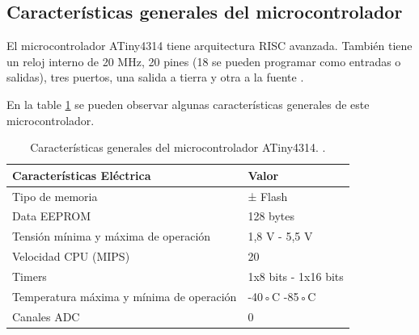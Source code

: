 \documentclass[12pt,letterpaper]{article}     %
\begin{document}
\subsection{Caracter\'isticas generales del microcontrolador} 
El microcontrolador ATiny4314 tiene arquitectura RISC avanzada. También tiene un reloj interno de 20 MHz, 20 pines (18 se pueden programar como entradas o salidas), tres puertos, una salida a tierra y otra a la fuente \cite{Microchip}.

En la table \ref{T:general} se pueden observar algunas caracter\'isticas generales de este microcontrolador. 

\begin{table}[H]
        \centering
        \begin{tabular}{| m{11cm} | m{4cm} | }
          \hline
          \textbf{Caracter\'isticas El\'ectrica} &  \textbf{Valor } \\
        \hline 
       Tipo de memoria & ± Flash\\
           \hline
       Data EEPROM  &  128 bytes \\
           \hline
       Tensi\'on m\'inima y m\'axima de operaci\'on  & 1,8 V - 5,5 V
        \\ 
           \hline
        Velocidad CPU (MIPS) & 20
        \\
           \hline
        Timers & 1x8 bits - 1x16 bits\\
           \hline
        Temperatura m\'axima y m\'inima de operaci\'on & -40◦C -85◦C\\
           \hline
        Canales ADC & 0 \\
        \hline
           \end{tabular}
        \caption{Caracter\'isticas generales del microcontrolador ATiny4314. \cite{Microchip}. }
        \label{T:general}
    \end{table}

\newpage
\end{document}
